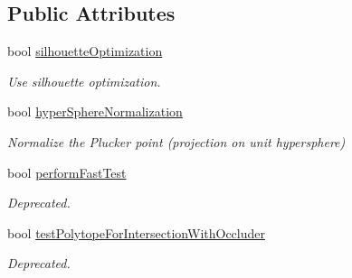 \subsection*{Public Attributes}
\begin{DoxyCompactItemize}
\item 
\mbox{\label{structvisilib_1_1_visibility_exact_query_configuration_a9c7e192417bf965199370bc13fe4d572}} 
bool \mbox{\hyperlink{structvisilib_1_1_visibility_exact_query_configuration_a9c7e192417bf965199370bc13fe4d572}{silhouette\+Optimization}}
\begin{DoxyCompactList}\small\item\em Use silhouette optimization. \end{DoxyCompactList}\item 
\mbox{\label{structvisilib_1_1_visibility_exact_query_configuration_ae3f308c718e6e7051c9d8a1d08065def}} 
bool \mbox{\hyperlink{structvisilib_1_1_visibility_exact_query_configuration_ae3f308c718e6e7051c9d8a1d08065def}{hyper\+Sphere\+Normalization}}
\begin{DoxyCompactList}\small\item\em Normalize the Plucker point (projection on unit hypersphere) \end{DoxyCompactList}\item 
\mbox{\label{structvisilib_1_1_visibility_exact_query_configuration_a1dc9eb7257bba268ce68a14cbcdd18d0}} 
bool \mbox{\hyperlink{structvisilib_1_1_visibility_exact_query_configuration_a1dc9eb7257bba268ce68a14cbcdd18d0}{perform\+Fast\+Test}}
\begin{DoxyCompactList}\small\item\em Deprecated. \end{DoxyCompactList}\item 
\mbox{\label{structvisilib_1_1_visibility_exact_query_configuration_a37b636febbcac1c265fd23d18145821b}} 
bool \mbox{\hyperlink{structvisilib_1_1_visibility_exact_query_configuration_a37b636febbcac1c265fd23d18145821b}{test\+Polytope\+For\+Intersection\+With\+Occluder}}
\begin{DoxyCompactList}\small\item\em Deprecated. \end{DoxyCompactList}\item 

\end{DoxyCompactItemize}
